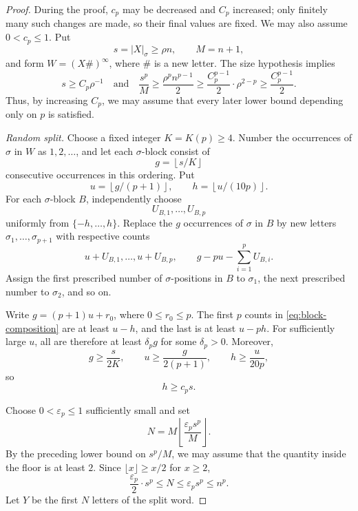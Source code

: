 \documentclass[10pt,a4paper]{amsart}
\newcommand{\floor}[1]{\left\lfloor #1\right\rfloor}
\begin{document}
\begin{proof}
During the proof, \(c_p\) may be decreased and \(C_p\) increased; only finitely many such changes are made, so their final values are fixed. We may also assume \(0<c_p\le1\). Put
\[
        s=|X|_\sigma\ge\rho n,
        \qquad
        M=n+1,
\]
and form \(W=(X\#)^\infty\), where \(\#\) is a new letter. The size hypothesis implies
\[
        s\ge C_p\rho^{-1}
        \quad\text{and}\quad
        \frac{s^p}{M}
        \ge \frac{\rho^pn^{p-1}}{2}
        \ge \frac{C_p^{p-1}}{2}\cdot\rho^{2-p}
        \ge \frac{C_p^{p-1}}{2}.
\]
Thus, by increasing \(C_p\), we may assume that every later lower bound depending only on \(p\) is satisfied.

\emph{Random split.}
Choose a fixed integer \(K=K(p)\ge4\). Number the occurrences of \(\sigma\) in \(W\) as \(1,2,\ldots\), and let each \(\sigma\)-block consist of
\[
        g=\floor{s/K}
\]
consecutive occurrences in this ordering. Put
\[
        u=\floor{g/(p+1)},
        \qquad
        h=\floor{u/(10p)}.
\]
For each \(\sigma\)-block \(B\), independently choose
\[
        U_{B,1},\ldots,U_{B,p}
\]
uniformly from \(\{-h,\ldots,h\}\). Replace the \(g\) occurrences of \(\sigma\) in \(B\) by new letters \(\sigma_1,\ldots,\sigma_{p+1}\) with respective counts
\begin{equation}\label{eq:block-composition}
        u+U_{B,1},\ldots,u+U_{B,p},
        \qquad
        g-pu-\sum_{i=1}^pU_{B,i}.
\end{equation}
Assign the first prescribed number of \(\sigma\)-positions in \(B\) to \(\sigma_1\), the next prescribed number to \(\sigma_2\), and so on.

Write \(g=(p+1)u+r_0\), where \(0\le r_0\le p\). The first \(p\) counts in \eqref{eq:block-composition} are at least \(u-h\), and the last is at least \(u-ph\). For sufficiently large \(u\), all are therefore at least \(\delta_pg\) for some \(\delta_p>0\). Moreover,
\[
        g\ge \frac{s}{2K},\qquad
        u\ge \frac{g}{2(p+1)},\qquad
        h\ge \frac{u}{20p},
\]
so
\begin{equation}\label{eq:h-comparable-s}
        h\ge c_ps.
\end{equation}

Choose \(0<\varepsilon_p\le1\) sufficiently small and set
\begin{equation}\label{eq:amplifier-length}
        N=M\floor{\frac{\varepsilon_ps^p}{M}}.
\end{equation}
By the preceding lower bound on \(s^p/M\), we may assume that the quantity inside the floor is at least \(2\). Since \(\lfloor x\rfloor\ge x/2\) for \(x\ge2\),
\begin{equation}\label{eq:N-bounds}
        \frac{\varepsilon_p}{2}\cdot s^p\le N\le \varepsilon_ps^p\le n^p.
\end{equation}
Let \(Y\) be the first \(N\) letters of the split word.


\end{proof}
\end{document}
